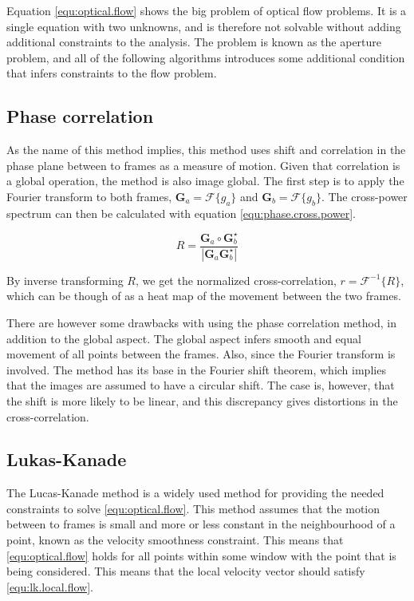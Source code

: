 Equation \eqref{equ:optical.flow} shows the big problem of optical flow problems. It is a single equation with two unknowns, and is therefore not 
solvable without adding additional constraints to the analysis. The problem is known as the aperture problem, and all of the following algorithms 
introduces some additional condition that infers constraints to the flow problem.

\subsection{Phase correlation}
As the name of this method implies, this method uses shift and correlation in the phase plane between to frames as a measure of motion. Given that correlation is a global operation,
the method is also image global. The first step is to apply the Fourier transform to both frames, $\textbf{G}_a = \mathcal{F}\{g_a\}$ and $\textbf{G}_b = \mathcal{F}\{g_b\}$. The cross-power spectrum 
can then be calculated with equation \eqref{equ:phase.cross.power}.

\begin{equation}\label{equ:phase.cross.power}
R = \frac{\textbf{G}_a \circ \textbf{G}_b^\star}{|\textbf{G}_a \textbf{G}_b^\star|}
\end{equation}

By inverse transforming $R$, we get the normalized cross-correlation, $r = \mathcal{F}^{-1}\{R\}$, which can be though of as a 
heat map of the movement between the two frames.

There are however some drawbacks with using the phase correlation method, in addition to the global aspect. The global aspect 
infers smooth and equal movement of all points between the frames. Also, since the Fourier transform is involved. The method has its base 
in the Fourier shift theorem, which implies that the images are assumed to have a circular shift. The case is, however, that the shift 
is more likely to be linear, and this discrepancy gives distortions in the cross-correlation.

\subsection{Lukas-Kanade}
The Lucas-Kanade method is a widely used method for providing the needed constraints to solve \eqref{equ:optical.flow}. This method assumes that 
the motion between to frames is small and more or less constant in the neighbourhood of a point, known as the velocity smoothness constraint. 
This means that \eqref{equ:optical.flow} holds for all points within some window
with the point that is being considered. This means that the local velocity vector should satisfy \eqref{equ:lk.local.flow}.

